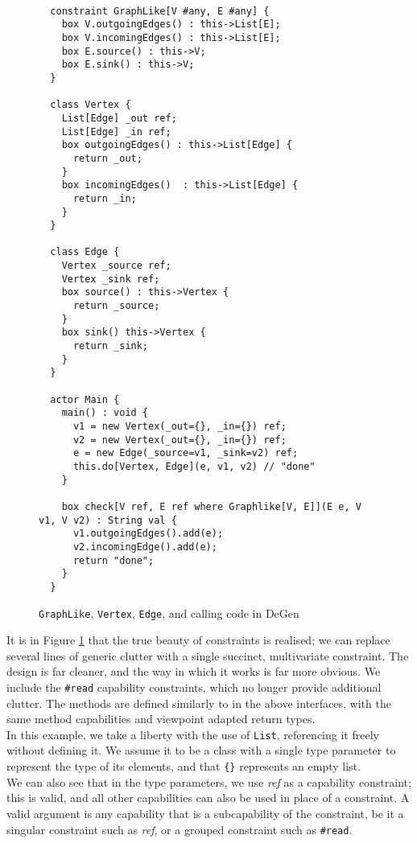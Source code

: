 \newpage

\begin{figure}[H]
    \centering
    \begin{verbatim}
    
  constraint GraphLike[V #any, E #any] {
    box V.outgoingEdges() : this->List[E];
    box V.incomingEdges() : this->List[E];
    box E.source() : this->V;
    box E.sink() : this->V;
  }
    
  class Vertex {
    List[Edge] _out ref;
    List[Edge] _in ref;
    box outgoingEdges() : this->List[Edge] {
      return _out;
    }
    box incomingEdges()  : this->List[Edge] {
      return _in;
    }
  }
        
  class Edge {
    Vertex _source ref;
    Vertex _sink ref;
    box source() : this->Vertex {
      return _source;
    }
    box sink() this->Vertex {
      return _sink;
    }
  }
    
  actor Main {
    main() : void {
      v1 = new Vertex(_out={}, _in={}) ref;
      v2 = new Vertex(_out={}, _in={}) ref;
      e = new Edge(_source=v1, _sink=v2) ref;
      this.do[Vertex, Edge](e, v1, v2) // "done"
    }

    box check[V ref, E ref where Graphlike[V, E]](E e, V v1, V v2) : String val {
      v1.outgoingEdges().add(e);
      v2.incomingEdge().add(e);
      return "done";
    }
  }
    \end{verbatim}
    \caption{\texttt{GraphLike}, \texttt{Vertex}, \texttt{Edge}, and calling code in DeGen}
    \label{fig:degen-graphlike}
\end{figure}

It is in Figure \ref{fig:degen-graphlike} that the true  beauty of constraints is realised; we can replace several lines of generic clutter with a single succinct, multivariate constraint. The design is far cleaner, and the way in which it works is far more obvious. We include the \texttt{\#read} capability constraints, which no longer provide additional clutter. The methods are defined similarly to in the above interfaces, with the same method capabilities and viewpoint adapted return types. \\

In this example, we take a liberty with the use of \texttt{List}, referencing it freely without defining it. We assume it to be a class with a single type parameter to represent the type of its elements, and that \texttt{\{\}} represents an empty list. \\

We can also see that in the type parameters, we use \textit{ref} as a capability constraint; this is valid, and all other capabilities can also be used in place of a constraint. A valid argument is any capability that is a subcapability of the constraint, be it a singular constraint such as \textit{ref}, or a grouped constraint such as \texttt{\#read}. \\

